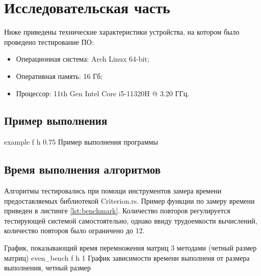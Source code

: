 \chapter{Исследовательская часть}
Ниже приведены технические характеристики устройства, на котором было проведено тестирование ПО:

\begin{itemize}
    \item Операционная система: Arch Linux \cite{arch} 64-bit;
    \item Оперативная память: 16 Гб;
    \item Процессор: 11th Gen Intel\textsuperscript{\tiny\textregistered} Core\textsuperscript{\tiny\texttrademark} i5-11320H @ 3.20 ГГц\cite{i5}.
\end{itemize}

\section{Пример выполнения}
{example} %
{f} %
{h} %
{0.75\textwidth} %
{Пример выполнения программы} %
\clearpage

\section{Время выполнения алгоритмов}
Алгоритмы тестировались при помощи инструментов замера времени предоставляемых библиотекой Criterion.rs\cite{Criterion}.
Пример функции по замеру времени приведен в листинге \ref{lst:benchmark}.
Количество повторов регулируется тестирующей системой самостоятельно, однако ввиду трудоемкости вычислений, количество повторов было ограничено до 12.


\newpage
График, показывающий время перемножения матриц 3 методами (четный размер матриц)\newline
{even_bench} %
{f} %
{h} %
{1\textwidth} %
{График зависимости времени выполнеия от размера выполнения, четный размер} %
\newpage

